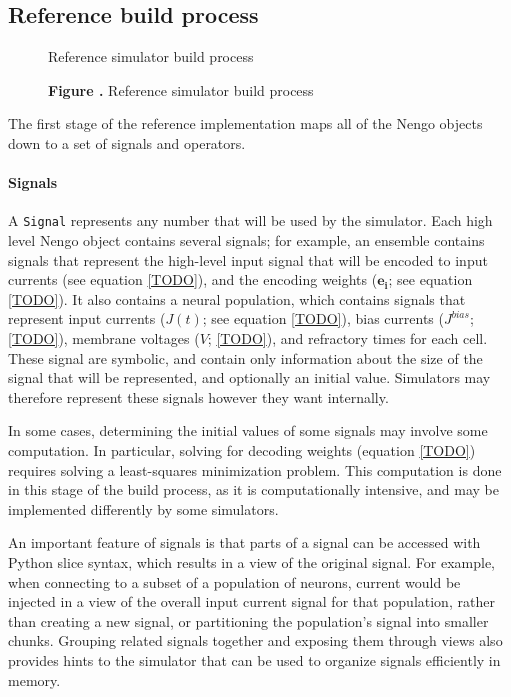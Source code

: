 \documentclass{frontiersSCNS}
\begin{document}
\subsection{Reference build process}

\begin{figure}
\begin{center}
  Reference simulator build process
\end{center}
 \textbf{\label{fig:01} Figure .}{
   Reference simulator build process}
\end{figure}

The first stage of the reference implementation
maps all of the Nengo objects
down to a set of signals and operators.

\paragraph{Signals}
A \texttt{Signal} represents any number that
will be used by the simulator.
Each high level Nengo object contains
several signals;
for example, an ensemble contains signals
that represent the high-level input
signal that will be encoded
to input currents (see equation \eqref{TODO}),
and the encoding weights
($\mathbf{e_i}$; see equation \eqref{TODO}).
It also contains a neural population,
which contains signals that represent
input currents
($J(t)$; see equation \eqref{TODO}),
bias currents ($J^{bias}$; \eqref{TODO}),
membrane voltages ($V$; \eqref{TODO}),
and refractory times for each cell.
These signal are symbolic,
and contain only information
about the size of the signal that will be represented,
and optionally an initial value.
Simulators may therefore represent
these signals however they want internally.

In some cases, determining
the initial values of some signals
may involve some computation.
In particular, solving for decoding weights
(equation \eqref{TODO}) requires
solving a least-squares minimization problem.
This computation is done in this stage
of the build process,
as it is computationally intensive,
and may be implemented
differently by some simulators.

An important feature of signals
is that parts of a signal
can be accessed with Python slice syntax,
which results in a view of the original signal.
For example, when connecting to
a subset of a population of neurons,
current would be injected
in a view of the overall input current signal
for that population,
rather than creating a new signal,
or partitioning the population's signal
into smaller chunks.
Grouping related signals together
and exposing them through views
also provides hints to the simulator
that can be used to organize signals
efficiently in memory.
\end{document}
